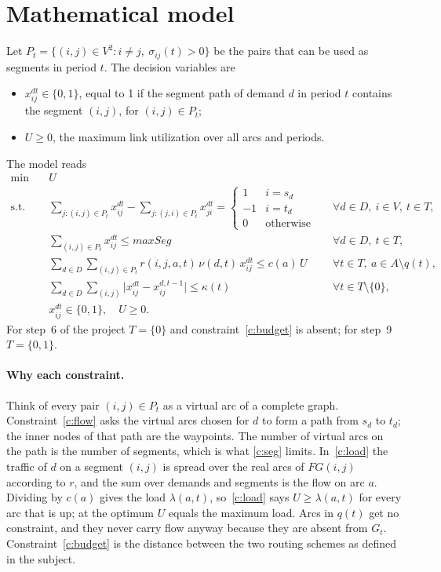\documentclass[11pt,a4paper]{article}
\newcommand{\maxseg}{\mathit{maxSeg}}
\begin{document}
\section{Mathematical model}\label{sec:model}

Let $P_t=\{(i,j)\in V^2: i\neq j,\ \sigma_{ij}(t)>0\}$ be the pairs that can be used as segments in
period $t$. The decision variables are
\begin{itemize}
  \item $x^{dt}_{ij}\in\{0,1\}$, equal to 1 if the segment path of demand $d$ in period $t$ contains
  the segment $(i,j)$, for $(i,j)\in P_t$;
  \item $U\ge 0$, the maximum link utilization over all arcs and periods.
\end{itemize}
The model reads
\begin{align}
\min\quad & U \nonumber\\
\text{s.t.}\quad
& \sum_{j:(i,j)\in P_t} x^{dt}_{ij}-\sum_{j:(j,i)\in P_t} x^{dt}_{ji}=
  \begin{cases}1 & i=s_d\\ -1 & i=t_d\\ 0 & \text{otherwise}\end{cases}
  && \forall d\in D,\ i\in V,\ t\in T, \label{c:flow}\\
& \sum_{(i,j)\in P_t} x^{dt}_{ij}\le \maxseg && \forall d\in D,\ t\in T, \label{c:seg}\\
& \sum_{d\in D}\sum_{(i,j)\in P_t} r(i,j,a,t)\,\nu(d,t)\,x^{dt}_{ij}\le c(a)\,U
  && \forall t\in T,\ a\in A\setminus q(t), \label{c:load}\\
& \sum_{d\in D}\sum_{(i,j)} \bigl|x^{dt}_{ij}-x^{d,t-1}_{ij}\bigr|\le \kappa(t)
  && \forall t\in T\setminus\{0\}, \label{c:budget}\\
& x^{dt}_{ij}\in\{0,1\},\quad U\ge 0. \nonumber
\end{align}
For step~6 of the project $T=\{0\}$ and constraint~\eqref{c:budget} is absent; for step~9
$T=\{0,1\}$.

\paragraph{Why each constraint.}
Think of every pair $(i,j)\in P_t$ as a virtual arc of a complete graph. Constraint~\eqref{c:flow}
asks the virtual arcs chosen for $d$ to form a path from $s_d$ to $t_d$; the inner nodes of that path
are the waypoints. The number of virtual arcs on the path is the number of segments, which is what
\eqref{c:seg} limits. In~\eqref{c:load} the traffic of $d$ on a segment $(i,j)$ is spread over the
real arcs of $FG(i,j)$ according to $r$, and the sum over demands and segments is the flow on arc
$a$. Dividing by $c(a)$ gives the load $\lambda(a,t)$, so~\eqref{c:load} says $U\ge\lambda(a,t)$ for
every arc that is up; at the optimum $U$ equals the maximum load. Arcs in $q(t)$ get no constraint,
and they never carry flow anyway because they are absent from $G_t$. Constraint~\eqref{c:budget} is
the distance between the two routing schemes as defined in the subject.
\end{document}
